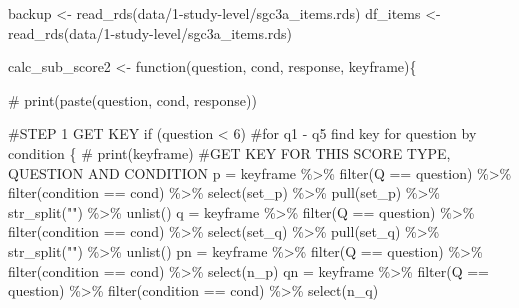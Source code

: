 \documentclass[
  letterpaper,
  DIV=11,
  numbers=noendperiod]{scrreprt}
\newenvironment{Shaded}{\begin{snugshade}}{\end{snugshade}}
\newcommand{\CommentTok}[1]{\textcolor[rgb]{0.37,0.37,0.37}{#1}}
\newcommand{\ControlFlowTok}[1]{\textcolor[rgb]{0.00,0.23,0.31}{#1}}
\newcommand{\DecValTok}[1]{\textcolor[rgb]{0.68,0.00,0.00}{#1}}
\newcommand{\FunctionTok}[1]{\textcolor[rgb]{0.28,0.35,0.67}{#1}}
\newcommand{\NormalTok}[1]{\textcolor[rgb]{0.00,0.23,0.31}{#1}}
\newcommand{\OtherTok}[1]{\textcolor[rgb]{0.00,0.23,0.31}{#1}}
\newcommand{\SpecialCharTok}[1]{\textcolor[rgb]{0.37,0.37,0.37}{#1}}
\newcommand{\StringTok}[1]{\textcolor[rgb]{0.13,0.47,0.30}{#1}}
\begin{document}
\begin{Shaded}
\begin{Highlighting}[]
\NormalTok{backup }\OtherTok{\textless{}{-}} \FunctionTok{read\_rds}\NormalTok{(}\StringTok{\textquotesingle{}data/1{-}study{-}level/sgc3a\_items.rds\textquotesingle{}}\NormalTok{)}
\NormalTok{df\_items }\OtherTok{\textless{}{-}} \FunctionTok{read\_rds}\NormalTok{(}\StringTok{\textquotesingle{}data/1{-}study{-}level/sgc3a\_items.rds\textquotesingle{}}\NormalTok{)}
\end{Highlighting}
\end{Shaded}

\begin{Shaded}
\begin{Highlighting}[]
\NormalTok{calc\_sub\_score2 }\OtherTok{\textless{}{-}} \ControlFlowTok{function}\NormalTok{(question, cond, response, keyframe)\{}

  \CommentTok{\# print(paste(question, cond, response))}

    \CommentTok{\#STEP 1 GET KEY}
  \ControlFlowTok{if}\NormalTok{ (question }\SpecialCharTok{\textless{}} \DecValTok{6}\NormalTok{) }\CommentTok{\#for q1 {-} q5 find key for question by condition}
\NormalTok{  \{}
    \CommentTok{\# print(keyframe)}
    \CommentTok{\#GET KEY FOR THIS SCORE TYPE, QUESTION AND CONDITION}
\NormalTok{    p }\OtherTok{=}\NormalTok{  keyframe }\SpecialCharTok{\%\textgreater{}\%} \FunctionTok{filter}\NormalTok{(Q }\SpecialCharTok{==}\NormalTok{ question) }\SpecialCharTok{\%\textgreater{}\%} \FunctionTok{filter}\NormalTok{(condition }\SpecialCharTok{==}\NormalTok{ cond) }\SpecialCharTok{\%\textgreater{}\%} \FunctionTok{select}\NormalTok{(set\_p) }\SpecialCharTok{\%\textgreater{}\%} \FunctionTok{pull}\NormalTok{(set\_p) }\SpecialCharTok{\%\textgreater{}\%} \FunctionTok{str\_split}\NormalTok{(}\StringTok{""}\NormalTok{) }\SpecialCharTok{\%\textgreater{}\%} \FunctionTok{unlist}\NormalTok{()}
\NormalTok{    q }\OtherTok{=}\NormalTok{  keyframe }\SpecialCharTok{\%\textgreater{}\%} \FunctionTok{filter}\NormalTok{(Q }\SpecialCharTok{==}\NormalTok{ question) }\SpecialCharTok{\%\textgreater{}\%} \FunctionTok{filter}\NormalTok{(condition }\SpecialCharTok{==}\NormalTok{ cond) }\SpecialCharTok{\%\textgreater{}\%} \FunctionTok{select}\NormalTok{(set\_q) }\SpecialCharTok{\%\textgreater{}\%} \FunctionTok{pull}\NormalTok{(set\_q) }\SpecialCharTok{\%\textgreater{}\%} \FunctionTok{str\_split}\NormalTok{(}\StringTok{""}\NormalTok{) }\SpecialCharTok{\%\textgreater{}\%} \FunctionTok{unlist}\NormalTok{()}
\NormalTok{    pn }\OtherTok{=}\NormalTok{ keyframe }\SpecialCharTok{\%\textgreater{}\%} \FunctionTok{filter}\NormalTok{(Q }\SpecialCharTok{==}\NormalTok{ question) }\SpecialCharTok{\%\textgreater{}\%} \FunctionTok{filter}\NormalTok{(condition }\SpecialCharTok{==}\NormalTok{ cond) }\SpecialCharTok{\%\textgreater{}\%} \FunctionTok{select}\NormalTok{(n\_p)}
\NormalTok{    qn }\OtherTok{=}\NormalTok{ keyframe }\SpecialCharTok{\%\textgreater{}\%} \FunctionTok{filter}\NormalTok{(Q }\SpecialCharTok{==}\NormalTok{ question) }\SpecialCharTok{\%\textgreater{}\%} \FunctionTok{filter}\NormalTok{(condition }\SpecialCharTok{==}\NormalTok{ cond) }\SpecialCharTok{\%\textgreater{}\%} \FunctionTok{select}\NormalTok{(n\_q)}


\end{Highlighting}
\end{Shaded}
\end{document}
